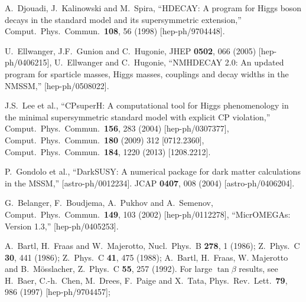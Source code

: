 \documentclass[12pt]{article}
\begin{document}
\begin{thebibliography}{999}
A.~Djouadi, J.~Kalinowski and M.~Spira,
  ``HDECAY: A program for Higgs boson decays in the standard model and its
  supersymmetric extension,''
  Comput.\ Phys.\ Commun.\  {\bf 108}, 56 (1998)
  [hep-ph/9704448].

U.~Ellwanger, J.F.~Gunion and C.~Hugonie,
  JHEP {\bf 0502}, 066 (2005)
  [hep-ph/0406215],
U.~Ellwanger and C.~Hugonie,
  ``NMHDECAY 2.0: An updated program for sparticle masses, Higgs masses,
  couplings and decay widths in the NMSSM,''
  [hep-ph/0508022].

J.S.~Lee et al.,
  ``CPsuperH: A computational tool for Higgs phenomenology in the minimal
  supersymmetric standard model with explicit CP violation,''
  Comput.\ Phys.\ Commun.\  {\bf 156}, 283 (2004)
  [hep-ph/0307377],
  Comput.\ Phys.\ Commun.\  {\bf 180} (2009) 312
  [0712.2360],
  Comput.\ Phys.\ Commun.\  {\bf 184}, 1220 (2013)
  [1208.2212].
  
P.~Gondolo et al.,
  ``DarkSUSY: A numerical package for dark matter calculations in the MSSM,''
  [astro-ph/0012234].
  JCAP {\bf 0407}, 008 (2004)
  [astro-ph/0406204].

G.~Belanger, F.~Boudjema, A.~Pukhov and A.~Semenov,
  Comput.\ Phys.\ Commun.\  {\bf 149}, 103 (2002)
  [hep-ph/0112278],
  ``MicrOMEGAs: Version 1.3,''
  [hep-ph/0405253].

  A.~Bartl, H.~Fraas and W.~Majerotto,
  Nucl.\ Phys.\ B {\bf 278}, 1 (1986);
  Z.\ Phys.\ C {\bf 30}, 441 (1986);
  Z.\ Phys.\ C {\bf 41}, 475 (1988);
A.~Bartl, H.~Fraas, W. Majerotto and B.~M\"osslacher,
  Z.\ Phys.\ C {\bf 55}, 257 (1992).
For large $\tan\beta$ results, see 
H.~Baer, C.-h.~Chen, M.~Drees, F.~Paige and X.~Tata,
  Phys.\ Rev.\ Lett.\  {\bf 79}, 986 (1997)
  [hep-ph/9704457];


\end{thebibliography}
\end{document}
